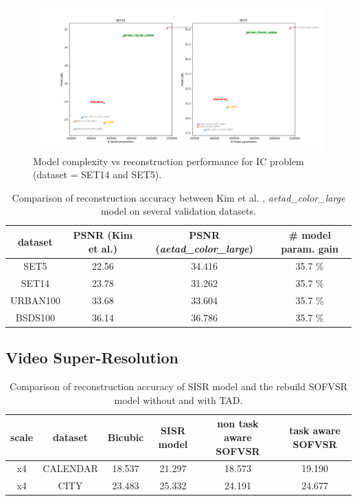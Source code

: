 \begin{figure}[!htbp]
	\centering
	\includegraphics[width=18cm]{figures/psnr_complexity_ic}
	\caption{Model complexity vs reconstruction performance for \ac{IC}
	problem (dataset = SET14 and SET5).}
  \label{fig:psnr_complexity_ic}
\end{figure}

\begin{table}[!htbp]
	\begin{center}
	\begin{tabular}{c|c|c|c}
	dataset & PSNR (Kim et al.) & PSNR (\textit{aetad\_color\_large})
	& \# model param. gain \\
	\hline
  SET5 & 22.56 & 34.416 & 35.7 \%\\
	SET14 & 23.78 & 31.262 & 35.7 \% \\
	URBAN100 & 33.68 & 33.604 & 35.7 \% \\
	BSDS100 & 36.14 & 36.786 & 35.7 \% \\
	\end{tabular}
	\caption{Comparison of reconstruction accuracy between Kim et al. \cite{TAID},
	\textit{aetad\_color\_large} model on several validation datasets. }
	\label{table:icperformance}
	\end{center}
\end{table}

\subsection{Video Super-Resolution}
\label{sec:Experiments_VSR}

\begin{table}[!htbp]
	\begin{center}
	\begin{tabular}{c|c|c|c|c|c}
	scale & dataset & Bicubic & \ac{SISR} model & non task aware SOFVSR
	& task aware SOFVSR \\
	\hline
  x4 & CALENDAR & 18.537 & 21.297 & 18.573  & 19.190 \\
	x4 & CITY & 23.483 & 25.332 & 24.191 & 24.677 \\
	\end{tabular}
	\caption{Comparison of reconstruction accuracy of \ac{SISR} model and
	the rebuild SOFVSR model without and with \ac{TAD}.}
	\label{table:vsrperformance}
	\end{center}
\end{table}


